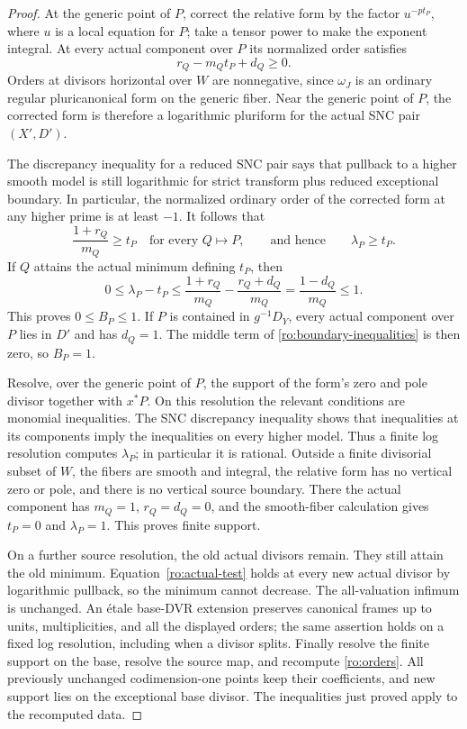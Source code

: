 \begin{proof}
At the generic point of $P$, correct the relative form by the factor
$u^{-pt_P}$, where $u$ is a local equation for $P$; take a tensor power to
make the exponent integral.  At every actual component over $P$ its
normalized order satisfies
\begin{equation}
 r_Q-m_Qt_P+d_Q\ge0.
 \label{ro:actual-test}
\end{equation}
Orders at divisors horizontal over $W$ are nonnegative, since
$\omega_J$ is an ordinary regular pluricanonical form on the generic
fiber.  Near the generic point of $P$, the corrected form is therefore a
logarithmic pluriform for the actual SNC pair $(X',D')$.

The discrepancy inequality for a reduced SNC pair says that pullback
to a higher smooth model is still logarithmic for strict transform plus
reduced exceptional boundary.  In particular, the normalized ordinary
order of the corrected form at any higher prime is at least $-1$.
It follows that
\[
 \frac{1+r_Q}{m_Q}\ge t_P
 \quad\text{for every }Q\mapsto P,
 \qquad\text{and hence}\qquad \lambda_P\ge t_P.
\]
If $Q$ attains the actual minimum defining $t_P$, then
\begin{equation}
 0\le\lambda_P-t_P
 \le \frac{1+r_Q}{m_Q}-\frac{r_Q+d_Q}{m_Q}
 =\frac{1-d_Q}{m_Q}\le1.
 \label{ro:boundary-inequalities}
\end{equation}
This proves $0\le B_P\le1$.  If $P$ is contained in $g^{-1}D_Y$, every
actual component over $P$ lies in $D'$ and has $d_Q=1$.  The middle term
of \eqref{ro:boundary-inequalities} is then zero, so $B_P=1$.

Resolve, over the generic point of $P$, the support of the form's zero
and pole divisor together with $x^*P$.  On this resolution the relevant
conditions are monomial inequalities.  The SNC discrepancy inequality
shows that inequalities at its components imply the inequalities on
every higher model.  Thus a finite log resolution computes $\lambda_P$;
in particular it is rational.  Outside a finite divisorial subset of
$W$, the fibers are smooth and integral, the relative form has no
vertical zero or pole, and there is no vertical source boundary.  There
the actual component has $m_Q=1$, $r_Q=d_Q=0$, and the smooth-fiber
calculation gives $t_P=0$ and $\lambda_P=1$.  This proves finite support.

On a further source resolution, the old actual divisors remain.  They
still attain the old minimum.  Equation~\eqref{ro:actual-test} holds at
every new actual divisor by logarithmic pullback, so the minimum cannot
decrease.  The all-valuation infimum is unchanged.  An \'etale base-DVR
extension preserves canonical frames up to units, multiplicities, and
all the displayed orders; the same assertion holds on a fixed log
resolution, including when a divisor splits.  Finally resolve the finite
support on the base, resolve the source map, and recompute
\eqref{ro:orders}.  All previously unchanged codimension-one points keep
their coefficients, and new support lies on the exceptional base
divisor.  The inequalities just proved apply to the recomputed data.
\end{proof}

